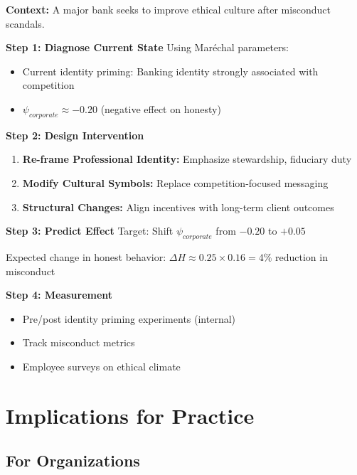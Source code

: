 \begin{tcolorbox}[colback=blue!5!white,colframe=blue!75!black,title=Application: Post-Crisis Bank Culture Reform]
\textbf{Context:} A major bank seeks to improve ethical culture after misconduct scandals.

\textbf{Step 1: Diagnose Current State}
Using Maréchal parameters:
\begin{itemize}
    \item Current identity priming: Banking identity strongly associated with competition
    \item $\psi_{corporate} \approx -0.20$ (negative effect on honesty)
\end{itemize}

\textbf{Step 2: Design Intervention}
\begin{enumerate}
    \item \textbf{Re-frame Professional Identity:} Emphasize stewardship, fiduciary duty
    \item \textbf{Modify Cultural Symbols:} Replace competition-focused messaging
    \item \textbf{Structural Changes:} Align incentives with long-term client outcomes
\end{enumerate}

\textbf{Step 3: Predict Effect}
Target: Shift $\psi_{corporate}$ from $-0.20$ to $+0.05$

Expected change in honest behavior: $\Delta H \approx 0.25 \times 0.16 = 4\%$ reduction in misconduct

\textbf{Step 4: Measurement}
\begin{itemize}
    \item Pre/post identity priming experiments (internal)
    \item Track misconduct metrics
    \item Employee surveys on ethical climate
\end{itemize}
\end{tcolorbox}

\section{Implications for Practice}

\subsection{For Organizations}

